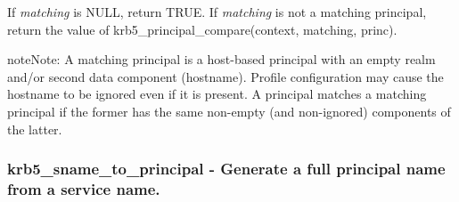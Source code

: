 \documentclass[letterpaper,10pt,english]{sphinxmanual}
\begin{document}
If \emph{matching} is NULL, return TRUE. If \emph{matching} is not a matching principal, return the value of krb5\_principal\_compare(context, matching, princ).

\begin{notice}{note}{Note:}
A matching principal is a host-based principal with an empty realm and/or second data component (hostname). Profile configuration may cause the hostname to be ignored even if it is present. A principal matches a matching principal if the former has the same non-empty (and non-ignored) components of the latter.
\end{notice}


\subsubsection{krb5\_sname\_to\_principal -  Generate a full principal name from a service name.}
\label{appdev/refs/api/krb5_sname_to_principal:krb5-sname-to-principal-generate-a-full-principal-name-from-a-service-name}\label{appdev/refs/api/krb5_sname_to_principal::doc}

\begin{fulllineitems}
\label{appdev/refs/api/krb5_sname_to_principal:krb5_sname_to_principal}
\end{fulllineitems}
\end{document}
